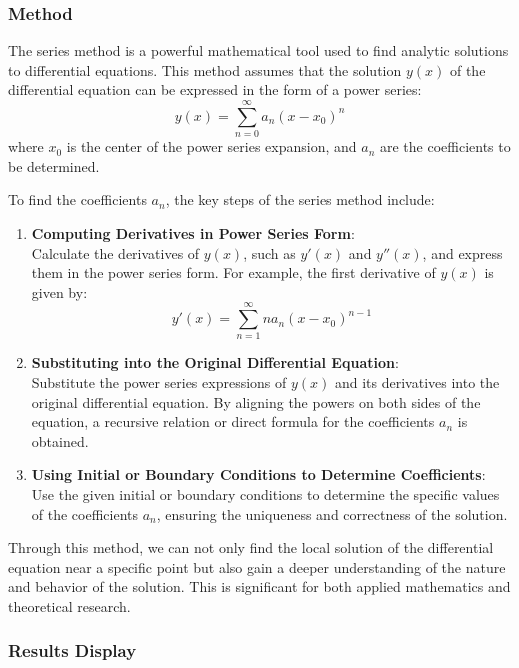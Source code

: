 \documentclass{article}
\begin{document}
\subsubsection{Method}
The series method is a powerful mathematical tool used to find analytic solutions to differential equations. This method assumes that the solution \( y(x) \) of the differential equation can be expressed in the form of a power series:
\[
y(x) = \sum_{n=0}^{\infty} a_n (x - x_0)^n
\]
where \( x_0 \) is the center of the power series expansion, and \( a_n \) are the coefficients to be determined.

To find the coefficients \( a_n \), the key steps of the series method include:

\begin{enumerate}
  \item \textbf{Computing Derivatives in Power Series Form}: \\
  Calculate the derivatives of \( y(x) \), such as \( y'(x) \) and \( y''(x) \), and express them in the power series form. For example, the first derivative of \( y(x) \) is given by:
  \[
  y'(x) = \sum_{n=1}^{\infty} n a_n (x - x_0)^{n-1}
  \]

  \item \textbf{Substituting into the Original Differential Equation}: \\
  Substitute the power series expressions of \( y(x) \) and its derivatives into the original differential equation. By aligning the powers on both sides of the equation, a recursive relation or direct formula for the coefficients \( a_n \) is obtained.

  \item \textbf{Using Initial or Boundary Conditions to Determine Coefficients}: \\
  Use the given initial or boundary conditions to determine the specific values of the coefficients \( a_n \), ensuring the uniqueness and correctness of the solution.
\end{enumerate}

Through this method, we can not only find the local solution of the differential equation near a specific point but also gain a deeper understanding of the nature and behavior of the solution. This is significant for both applied mathematics and theoretical research.


\subsubsection{Results Display}
\end{document}
